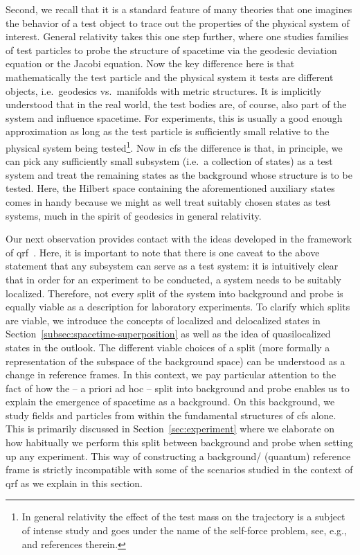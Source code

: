 \documentclass[reqno,11pt]{amsart}
\numberwithin{equation}{section}
\begin{document}
Second, we recall that it is a standard feature of many theories that one imagines the behavior of a test object to trace
out the properties of the physical system of interest.
General relativity takes this one step further, where one studies families of test particles to probe the structure of
spacetime via the geodesic deviation equation or the Jacobi equation.
Now the key difference here is that mathematically the test particle and the physical system it tests are different objects,
i.e.~geodesics vs.~manifolds with metric structures.
It is implicitly understood that in the real world, the test bodies are, of course, also part of the system and influence spacetime.
For experiments, this is usually a good enough approximation as long as the test particle is sufficiently small relative
to the physical system being tested\footnote{
    In general relativity the effect of the test mass on the trajectory is a subject of intense study and goes under the
    name of the self-force problem, see, e.g.,~\cite{harte2018foundations,thompson2019gravitational} and references therein.
}.
Now in \ac{cfs} the difference is that, in principle, we can pick any sufficiently small subsystem (i.e.~a collection of states)
as a test system and treat the remaining states as the background whose structure is to be tested.
Here, the Hilbert space containing the aforementioned auxiliary states comes in handy because we might as well treat
suitably chosen states as test systems, much in the spirit of geodesics in general relativity.

Our next observation provides contact with the ideas developed in the framework of \ac{qrf}~\cite{lake2023quantum,goeller2022frames, quantumFrameRelativity, bartlett2007reference, fewster2025quantum,Apadula2024quantumreference, ali2024quantum, Krumm2021quantumreference,Yang2020switchingquantum,carette2025operational,giacomini2019quantum}.
Here, it is important to note that there is one caveat to the above statement that any subsystem can serve as a test system:
it is intuitively clear that in order for an experiment to be conducted, a system needs to be suitably localized.
Therefore, not every split of the system into background and probe is equally viable as a description for laboratory experiments.
To clarify which splits are viable, we introduce the concepts of localized and delocalized states in Section~\ref{subsec:spacetime-superposition} as well as the idea
of quasilocalized states in the outlook.
The different viable choices of a split (more formally a representation of the subspace of the background space)
can be understood as a change in reference frames.
In this context, we pay particular attention to the fact of how the -- a priori ad hoc -- split into background and probe enables
us to explain the emergence of spacetime as a background.
On this background, we study fields and particles from within the fundamental structures of \ac{cfs} alone.
This is primarily discussed in Section~\ref{sec:experiment} where we elaborate on how habitually we perform this split
between background and probe when setting up any experiment.
This way of constructing a background/ (quantum) reference frame is strictly incompatible with some of the scenarios studied
in the context of \ac{qrf} as we explain in this section.
\end{document}
